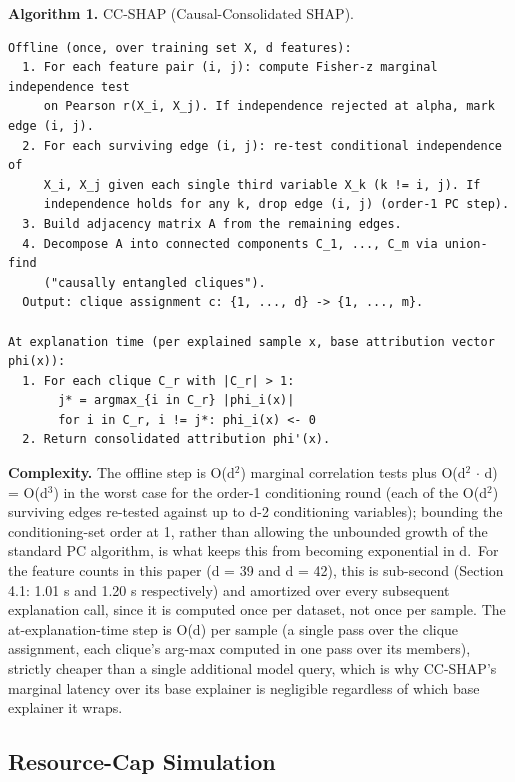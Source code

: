 \textbf{Algorithm 1.} CC-SHAP (Causal-Consolidated SHAP).

\begin{verbatim}
Offline (once, over training set X, d features):
  1. For each feature pair (i, j): compute Fisher-z marginal independence test
     on Pearson r(X_i, X_j). If independence rejected at alpha, mark edge (i, j).
  2. For each surviving edge (i, j): re-test conditional independence of
     X_i, X_j given each single third variable X_k (k != i, j). If
     independence holds for any k, drop edge (i, j) (order-1 PC step).
  3. Build adjacency matrix A from the remaining edges.
  4. Decompose A into connected components C_1, ..., C_m via union-find
     ("causally entangled cliques").
  Output: clique assignment c: {1, ..., d} -> {1, ..., m}.

At explanation time (per explained sample x, base attribution vector phi(x)):
  1. For each clique C_r with |C_r| > 1:
       j* = argmax_{i in C_r} |phi_i(x)|
       for i in C_r, i != j*: phi_i(x) <- 0
  2. Return consolidated attribution phi'(x).
\end{verbatim}

\textbf{Complexity.} The offline step is O(d$^{2}$) marginal correlation tests plus O(d$^{2}$ $\cdot$ d) = O(d$^{3}$) in the worst case for the order-1 conditioning round (each of the O(d$^{2}$) surviving edges re-tested against up to d-2 conditioning variables); bounding the conditioning-set order at 1, rather than allowing the unbounded growth of the standard PC algorithm, is what keeps this from becoming exponential in d.~For the feature counts in this paper (d = 39 and d = 42), this is sub-second (Section 4.1: 1.01 s and 1.20 s respectively) and amortized over every subsequent explanation call, since it is computed once per dataset, not once per sample. The at-explanation-time step is O(d) per sample (a single pass over the clique assignment, each clique's arg-max computed in one pass over its members), strictly cheaper than a single additional model query, which is why CC-SHAP's marginal latency over its base explainer is negligible regardless of which base explainer it wraps.

\subsection{Resource-Cap Simulation}\label{resource-cap-simulation}

